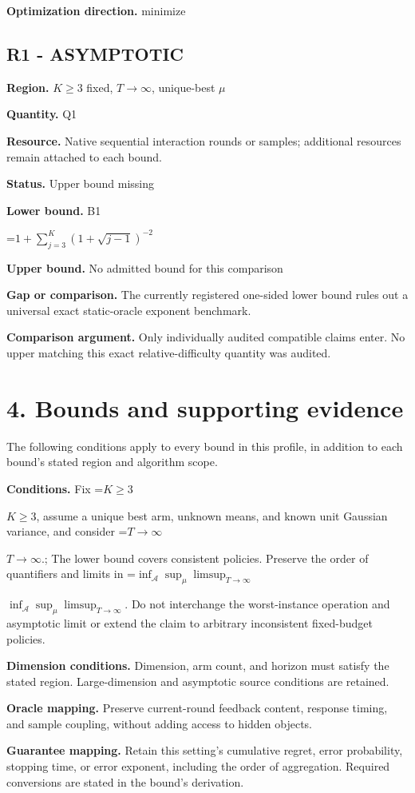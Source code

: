 \documentclass[10pt,a4paper]{article}
\newcommand{\AtlasMath}[1]{\par\begingroup\centering\setbox0=\hbox{$\displaystyle #1$}\ifdim\wd0>1.4\linewidth\typeout{ATLAS WIDE FORMULA: \the\wd0}\fi\ifdim\wd0>\linewidth\resizebox{\linewidth}{!}{\box0}\else\box0\fi\par\endgroup}
\newcommand{\AtlasInlineMath}[1]{\begingroup\setbox0=\hbox{$#1$}\ifdim\wd0>.4\linewidth\endgroup\AtlasMath{#1}\else\endgroup$#1$\fi}
\begin{document}
\textbf{Optimization direction.} minimize

\subsection{R1 - ASYMPTOTIC}
\textbf{Region.} $K\ge 3$ fixed, $T\to \infty$, unique-best $\mu$

\textbf{Quantity.} Q1

\textbf{Resource.} Native sequential interaction rounds or samples; additional resources remain attached to each bound.

\textbf{Status.} Upper bound missing

\textbf{Lower bound.} B1

\AtlasMath{1+\sum _{j=3}^K(1+\sqrt{j-1})^{-2}}
\textbf{Upper bound.} No admitted bound for this comparison

\textbf{Gap or comparison.} The currently registered one-sided lower bound rules out a universal exact static-oracle exponent benchmark.

\textbf{Comparison argument.} Only individually audited compatible claims enter. No upper matching this exact relative-difficulty quantity was audited.

\section{4. Bounds and supporting evidence}
The following conditions apply to every bound in this profile, in addition to each bound's stated region and algorithm scope.

\textbf{Conditions.} Fix \AtlasInlineMath{K\ge3}, assume a unique best arm, unknown means, and known unit Gaussian variance, and consider \AtlasInlineMath{T\to\infty}.; The lower bound covers consistent policies. Preserve the order of quantifiers and limits in \AtlasInlineMath{\inf_{\mathcal A}\sup_\mu\limsup_{T\to\infty}}. Do not interchange the worst-instance operation and asymptotic limit or extend the claim to arbitrary inconsistent fixed-budget policies.

\textbf{Dimension conditions.} Dimension, arm count, and horizon must satisfy the stated region. Large-dimension and asymptotic source conditions are retained.

\textbf{Oracle mapping.} Preserve current-round feedback content, response timing, and sample coupling, without adding access to hidden objects.

\textbf{Guarantee mapping.} Retain this setting's cumulative regret, error probability, stopping time, or error exponent, including the order of aggregation. Required conversions are stated in the bound's derivation.
\end{document}
